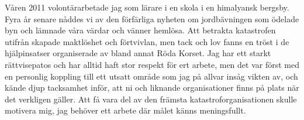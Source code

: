 \documentclass[11pt, a4paper]{../awesome-cv} %
\begin{document}
\makecvheader %

\makelettertitle %


\begin{cvletter}





Våren 2011 volontärarbetade jag som lärare i en skola i en himalyansk bergsby. %
Fyra år senare nåddes vi av den förfärliga nyheten om jordbävningen som ödelade byn och lämnade våra värdar och vänner hemlösa. %
Att betrakta katastrofen utifr{\aa}n skapade maktl{\"o}shet och f{\"o}rtvivlan, men tack och lov fanns en tröst i de hjälpinsatser organiserade av bland annat Röda Korset. %
Jag har ett starkt r{\"a}ttvisepatos och har alltid haft stor respekt f{\"o}r ert arbete, %
men det var f{\"o}rst med en personlig koppling till ett utsatt omr{\aa}de som jag p{\aa} allvar ins{\aa}g vikten av, och k{\"a}nde djup tacksamhet inför, att ni och liknande organisationer finns p{\aa} plats n{\"a}r det verkligen g{\"a}ller. 
Att få vara del av den fr{\"a}msta katastroforganisationen skulle motivera mig, jag beh{\"o}ver ett arbete d{\"a}r målet känns meningsfullt. 


\end{cvletter}
\end{document}
